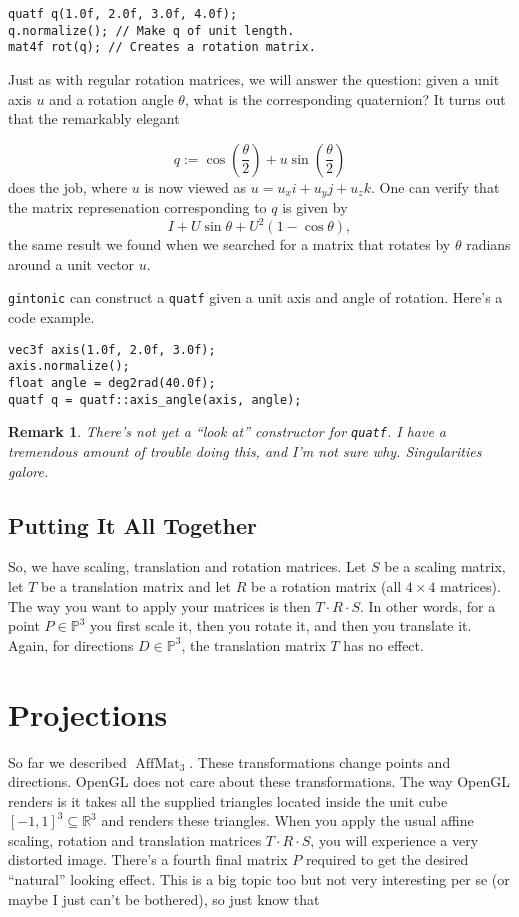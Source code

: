 \documentclass{article}
\newtheorem{remark}[definition]{Remark}
\DeclareMathOperator{\AffMat}{AffMat}
\begin{document}
\begin{lstlisting}
quatf q(1.0f, 2.0f, 3.0f, 4.0f);
q.normalize(); // Make q of unit length.
mat4f rot(q); // Creates a rotation matrix.
\end{lstlisting}

Just as with regular rotation matrices, we will answer the question: given a unit axis $u$ and a rotation angle $\theta$, what is the corresponding quaternion? It turns out that the remarkably elegant

\[ q := \cos\left( \frac{\theta}{2} \right) + u\sin \left( \frac{\theta}{2} \right) \]
does the job, where $u$ is now viewed as $u = u_xi + u_yj + u_zk$. One can verify that the matrix represenation corresponding to $q$ is given by
\[ I + U\sin\theta + U^2 (1-\cos \theta),\]
the same result we found when we searched for a matrix that rotates by $\theta$ radians around a unit vector $u$.

\texttt{gintonic} can construct a \texttt{quatf} given a unit axis and angle of rotation. Here's a code example.

\begin{lstlisting}
vec3f axis(1.0f, 2.0f, 3.0f);
axis.normalize();
float angle = deg2rad(40.0f);
quatf q = quatf::axis_angle(axis, angle);
\end{lstlisting}

\begin{remark}
There's not yet a ``look at'' constructor for \texttt{quatf}. I have a tremendous amount of trouble doing this, and I'm not sure why. Singularities galore.
\end{remark}

\subsection{Putting It All Together}

So, we have scaling, translation and rotation matrices. Let $S$ be a scaling matrix, let $T$ be a translation matrix and let $R$ be a rotation matrix (all $4 \times 4$ matrices). The way you want to apply your matrices is then $T \cdot R \cdot S$. In other words, for a point $P \in \mathbb{P}^3$ you first scale it, then you rotate it, and then you translate it. Again, for directions $D \in \mathbb{P}^3$, the translation matrix $T$ has no effect.

\section{Projections}
So far we described $\AffMat_3$. These transformations change points and directions. OpenGL does not care about these transformations. The way OpenGL renders is it takes all the supplied triangles located inside the unit cube $[-1,1]^3 \subseteq \mathbb{R}^3$ and renders these triangles. When you apply the usual affine scaling, rotation and translation matrices $T \cdot R \cdot S$, you will experience a very distorted image. There's a fourth final matrix $P$ required to get the desired ``natural'' looking effect. This is a big topic too but not very interesting per se (or maybe I just can't be bothered), so just know that
\end{document}
